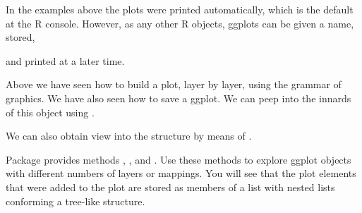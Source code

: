 \documentclass[krantz2]{krantz}\usepackage{knitr}%
\begin{document}
\begin{warningbox}
  In the examples above the plots were printed automatically, which is the default at the R console. However, as any other R objects, ggplots can be given a name, stored,

\begin{knitrout}\footnotesize
{}\color{fgcolor}\begin{kframe}
\begin{alltt}
 \hlkwb{<-} \hlstd{(} 
            \hlstd{(}    \hlopt{+}
       \hlstd{()}
\end{alltt}
\end{kframe}
\end{knitrout}

and printed at a later time.

\begin{knitrout}\footnotesize
{}\color{fgcolor}\begin{kframe}
\begin{alltt}
\end{alltt}
\end{kframe}
\end{knitrout}
\end{warningbox}

\begin{advplayground}
Above we have seen how to build a plot, layer by layer, using the grammar of graphics. We have also seen how to save a ggplot. We can peep into the innards of this object using .

\begin{knitrout}\footnotesize
{}\color{fgcolor}\begin{kframe}
\begin{alltt}
\end{alltt}
\end{kframe}
\end{knitrout}
We can also obtain view into the structure by means of .

Package  provides methods , ,  and  . Use these methods to explore ggplot objects with different numbers of layers or mappings. You will see that the plot elements that were added to the plot are stored as members of a list with nested lists conforming a tree-like structure.
\end{advplayground}
\end{document}
